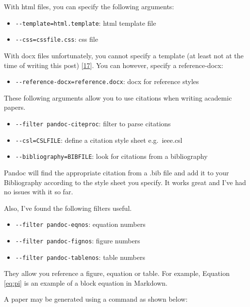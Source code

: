\documentclass[journal,]{IEEEtran}
\providecommand{\tightlist}{%
  \setlength{\itemsep}{0pt}\setlength{\parskip}{0pt}}
\newcounter{figno}
\newcounter{tableno}
\begin{document}
With html files, you can specify the following arguments:

\begin{itemize}
\tightlist
\item
  \texttt{-\/-template=html.template}: html template file
\item
  \texttt{-\/-css=cssfile.css}: css file
\end{itemize}

With docx files unfortunately, you cannot specify a template (at least
not at the time of writing this post)
{[}\protect\hyperlink{ref-noauthor_googlegroups_nodate}{17}{]}. You can
however, specify a reference-docx:

\begin{itemize}
\tightlist
\item
  \texttt{-\/-reference-docx=reference.docx}: docx for reference styles
\end{itemize}

These following arguments allow you to use citations when writing
academic papers.

\begin{itemize}
\tightlist
\item
  \texttt{-\/-filter\ pandoc-citeproc}: filter to parse citations
\item
  \texttt{-\/-csl=CSLFILE}: define a citation style sheet e.g.~ieee.csl
\item
  \texttt{-\/-bibliography=BIBFILE}: look for citations from a
  bibliography
\end{itemize}

Pandoc will find the appropriate citation from a .bib file and add it to
your Bibliography according to the style sheet you specify. It works
great and I've had no issues with it so far.

Also, I've found the following filters useful.

\begin{itemize}
\tightlist
\item
  \texttt{-\/-filter\ pandoc-eqnos}: equation numbers
\item
  \texttt{-\/-filter\ pandoc-fignos}: figure numbers
\item
  \texttt{-\/-filter\ pandoc-tablenos}: table numbers
\end{itemize}

They allow you reference a figure, equation or table. For example,
Equation \ref{eq:pi} is an example of a block equation in Markdown.

A paper may be generated using a command as shown below:
\end{document}
